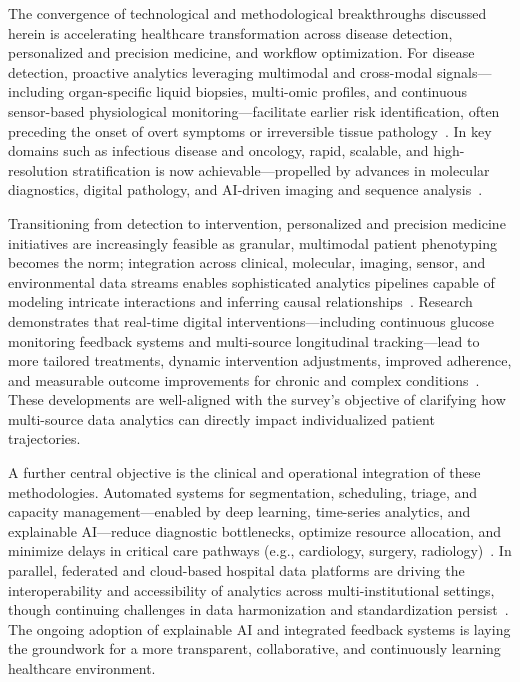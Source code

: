 \documentclass[sigconf]{acmart}
\begin{document}
The convergence of technological and methodological breakthroughs discussed herein is accelerating healthcare transformation across disease detection, personalized and precision medicine, and workflow optimization. For disease detection, proactive analytics leveraging multimodal and cross-modal signals—including organ-specific liquid biopsies, multi-omic profiles, and continuous sensor-based physiological monitoring—facilitate earlier risk identification, often preceding the onset of overt symptoms or irreversible tissue pathology~\cite{ref21,ref51,ref63,ref82,ref94}. In key domains such as infectious disease and oncology, rapid, scalable, and high-resolution stratification is now achievable—propelled by advances in molecular diagnostics, digital pathology, and AI-driven imaging and sequence analysis~\cite{ref18,ref25,ref41,ref51,ref52,ref53,ref62,ref63,ref66,ref67,ref105}.

Transitioning from detection to intervention, personalized and precision medicine initiatives are increasingly feasible as granular, multimodal patient phenotyping becomes the norm; integration across clinical, molecular, imaging, sensor, and environmental data streams enables sophisticated analytics pipelines capable of modeling intricate interactions and inferring causal relationships~\cite{ref28,ref29,ref31,ref33,ref35,ref38,ref49,ref54,ref60,ref63,ref65,ref94,ref104}. Research demonstrates that real-time digital interventions—including continuous glucose monitoring feedback systems and multi-source longitudinal tracking—lead to more tailored treatments, dynamic intervention adjustments, improved adherence, and measurable outcome improvements for chronic and complex conditions~\cite{ref27,ref90,ref95,ref101}. These developments are well-aligned with the survey's objective of clarifying how multi-source data analytics can directly impact individualized patient trajectories.

A further central objective is the clinical and operational integration of these methodologies. Automated systems for segmentation, scheduling, triage, and capacity management—enabled by deep learning, time-series analytics, and explainable AI—reduce diagnostic bottlenecks, optimize resource allocation, and minimize delays in critical care pathways (e.g., cardiology, surgery, radiology)~\cite{ref49,ref72,ref73,ref74,ref75,ref76,ref100,ref101}. In parallel, federated and cloud-based hospital data platforms are driving the interoperability and accessibility of analytics across multi-institutional settings, though continuing challenges in data harmonization and standardization persist~\cite{ref88,ref89}. The ongoing adoption of explainable AI and integrated feedback systems is laying the groundwork for a more transparent, collaborative, and continuously learning healthcare environment.
\end{document}
